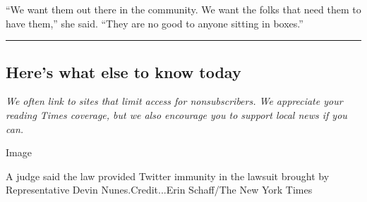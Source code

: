 ``We want them out there in the community. We want the folks that need
them to have them,'' she said. ``They are no good to anyone sitting in
boxes.''

\begin{center}\rule{0.5\linewidth}{\linethickness}\end{center}

\hypertarget{heres-what-else-to-know-today}{%
\subsection{Here's what else to know
today}\label{heres-what-else-to-know-today}}

\emph{We often link to sites that limit access for nonsubscribers. We
appreciate your reading Times coverage, but we also encourage you to
support local news if you can.}

Image

A judge said the law provided Twitter immunity in the lawsuit brought by
Representative Devin Nunes.Credit...Erin Schaff/The New York Times

